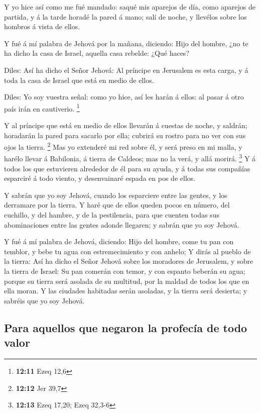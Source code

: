  Y yo hice así como me fué mandado: saqué mis aparejos de
día, como aparejos de partida, y á la tarde horadé la pared á mano; salí
de noche, y llevélos sobre los hombros á vista de ellos.

 Y fué á mí palabra de Jehová por la mañana, diciendo:
 Hijo del hombre, ¿no te ha dicho la casa de Israel, aquella
casa rebelde: ¿Qué haces?

 Diles: Así ha dicho el Señor Jehová: Al príncipe en
Jerusalem es esta carga, y á toda la casa de Israel que está en medio de
ellos.

 Diles: Yo soy vuestra señal: como yo hice, así les harán á
ellos: al pasar á otro país irán en cautiverio. \footnote{\textbf{12:11}
  Ezeq 12,6}

 Y al príncipe que está en medio de ellos llevarán á
cuestas de noche, y saldrán; horadarán la pared para sacarlo por ella;
cubrirá su rostro para no ver con sus ojos la tierra. \footnote{\textbf{12:12}
  Jer 39,7}  Mas yo extenderé mi red sobre él, y será preso
en mi malla, y harélo llevar á Babilonia, á tierra de Caldeos; mas no la
verá, y allá morirá. \footnote{\textbf{12:13} Ezeq 17,20; Ezeq 32,3-6}
 Y á todos los que estuvieren alrededor de él para su
ayuda, y á todas sus compañías esparciré á todo viento, y desenvainaré
espada en pos de ellos.

 Y sabrán que yo soy Jehová, cuando los esparciere entre
las gentes, y los derramare por la tierra.  Y haré que de
ellos queden pocos en número, del cuchillo, y del hambre, y de la
pestilencia, para que cuenten todas sus abominaciones entre las gentes
adonde llegaren; y sabrán que yo soy Jehová.

 Y fué á mí palabra de Jehová, diciendo:  Hijo
del hombre, come tu pan con temblor, y bebe tu agua con estremecimiento
y con anhelo;  Y dirás al pueblo de la tierra: Así ha dicho
el Señor Jehová sobre los moradores de Jerusalem, y sobre la tierra de
Israel: Su pan comerán con temor, y con espanto beberán su agua; porque
su tierra será asolada de su multitud, por la maldad de todos los que en
ella moran.  Y las ciudades habitadas serán asoladas, y la
tierra será desierta; y sabréis que yo soy Jehová.

\hypertarget{para-aquellos-que-negaron-la-profecuxeda-de-todo-valor}{%
\subsection{Para aquellos que negaron la profecía de todo
valor}\label{para-aquellos-que-negaron-la-profecuxeda-de-todo-valor}}

